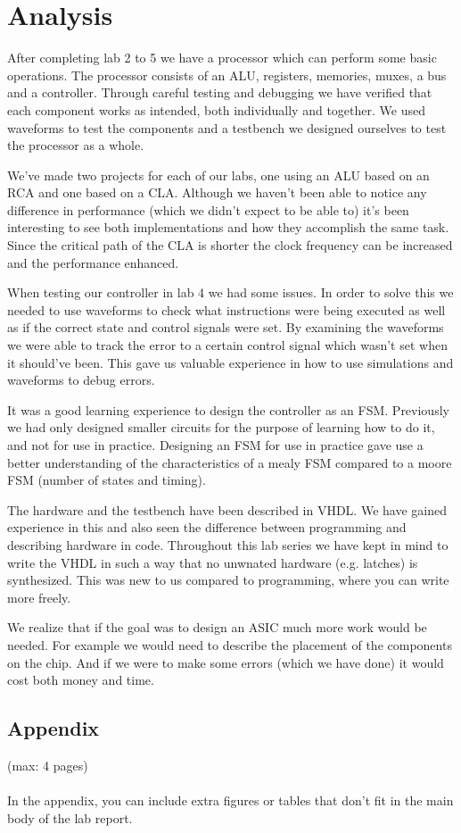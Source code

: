 \documentclass[a4paper,11pt]{article}
\begin{document}
\newpage
\section{Analysis}

After completing lab 2 to 5 we have a processor which can perform some basic operations. The processor consists of an ALU, registers, memories, muxes, a bus and a controller. Through careful testing and debugging we have verified that each component works as intended, both individually and together. We used waveforms to test the components and a testbench we designed ourselves to test the processor as a whole.

We've made two projects for each of our labs, one using an ALU based on an RCA and one based on a CLA. Although we haven't been able to notice any difference in performance (which we didn't expect to be able to) it's been interesting to see both implementations and how they accomplish the same task. Since the critical path of the CLA is shorter the clock frequency can be increased and the performance enhanced.
 
When testing our controller in lab 4 we had some issues. In order to solve this we needed to use waveforms to check what instructions were being executed as well as if the correct state and control signals were set. By examining the waveforms we were able to track the error to a certain control signal which wasn't set when it should've been. This gave us valuable experience in how to use simulations and waveforms to debug errors.

It was a good learning experience to design the controller as an FSM. Previously we had only designed smaller circuits for the purpose of learning how to do it, and not for use in practice. Designing an FSM for use in practice gave use a better understanding of the characteristics of a mealy FSM compared to a moore FSM (number of states and timing).

The hardware and the testbench have been described in VHDL. We have gained experience in this and also seen the difference between programming and describing hardware in code. Throughout this lab series we have kept in mind to write the VHDL in such a way that no unwnated  hardware (e.g. latches) is synthesized. This was new to us compared to programming, where you can write more freely.

We realize that if the goal was to design an ASIC much more work would be needed. For example we would need to describe the placement of the components on the chip. And if we were to make some errors (which we have done) it would cost both money and time.

\newpage
\begin{appendix}

\section{Appendix}
(max: 4 pages)
\\\\
In the appendix, you can include extra figures or tables that don't fit in the main body of the lab report. 

\end{appendix}
\end{document}
